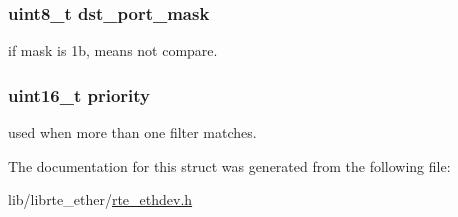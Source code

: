 \subsubsection[{dst\+\_\+port\+\_\+mask}]{\setlength{\rightskip}{0pt plus 5cm}uint8\+\_\+t dst\+\_\+port\+\_\+mask}\label{structrte__2tuple__filter_a3c1c59f1493644594dfc6e6907a97936}
if mask is 1b, means not compare. \hypertarget{structrte__2tuple__filter_a0815784d41b3c13d42ce22367abfba1d}{}
\subsubsection[{priority}]{\setlength{\rightskip}{0pt plus 5cm}uint16\+\_\+t priority}\label{structrte__2tuple__filter_a0815784d41b3c13d42ce22367abfba1d}
used when more than one filter matches. 

The documentation for this struct was generated from the following file\+:\begin{DoxyCompactItemize}
\item 
lib/librte\+\_\+ether/\hyperlink{rte__ethdev_8h}{rte\+\_\+ethdev.\+h}\end{DoxyCompactItemize}
